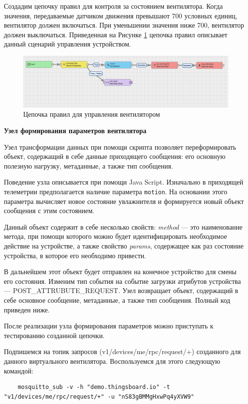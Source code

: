 \documentclass[utf8x]{G7-32} %
\newcommand{\pathToScriptsFolder}{/home/denilai/Documents/repos/latex/scripts}
\begin{document}
Создадим цепочку правил для контроля за состоянием вентилятора. Когда значения, передаваемые датчиком движения превышают 700 условных единиц, вентилятор должен включаться. При уменьшении значения ниже 700, вентилятор должен выключаться. Приведенная на Рисунке \ref{fig:chains} цепочка правил описывает данный сценарий управления устройством.

\begin{figure}[h!]
	\centering
	\includegraphics[width=0.6\linewidth]{images/chains}
	\caption{Цепочка правил для управления вентилятором}
	\label{fig:chains}
\end{figure}


\textbf{Узел формирования параметров вентилятора}

Узел трансформации данных при помощи скрипта позволяет переформировать объект,
содержащий в себе данные приходящего сообщения: его основную полезную нагрузку,
метаданные, а также тип сообщения.

Поведение узла описывается при помощи Java Script. Изначально в приходящей телеметрии
предполагается наличие параметра \texttt{motion}. На основании этого параметра
вычисляет новое состояние увлажнителя и формируется новый объект сообщения с этим
состоянием. 

Данный объект содержит в себе несколько свойств: \textit{method} --- это наименование
метода, при помощи которого можно будет идентифицировать необходимое действие на
устройстве, а также свойство \textit{params}, содержащее как раз состояние устройства, в которое
его необходимо привести. 

В дальнейшем этот объект будет отправлен на конечное
устройство для смены его состояния. Изменим тип события на событие загрузки
атрибутов устройства --- POST\_ATTRUBUTE\_REQUEST. Узел возвращает объект, содержащий в себе основное
сообщение, метаданные, а также тип сообщения. Полный код приведен ниже.




После реализации узла формирования параметров можно приступать к тестированию созданной цепочки. 

Подпишемся на топик запросов (v1/devices/me/rpc/request/+) созданного для данного
виртуального вентилятора. Воспользуемся для этого следующую командой:
\newpage
\begin{lstlisting}
	mosquitto_sub -v -h "demo.thingsboard.io" -t "v1/devices/me/rpc/request/+" -u "nS83gBMMgHxwPq4yXVW9"
\end{lstlisting}
\end{document}
